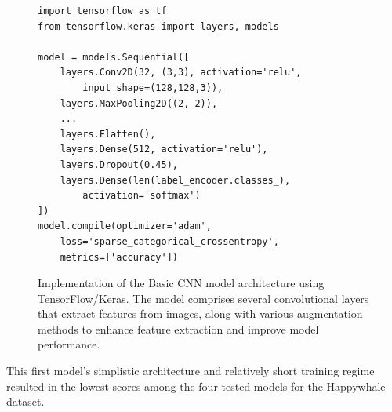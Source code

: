 \documentclass[twocolumn]{article}
\begin{document}
\lstset{
    language=Python,
    basicstyle=\footnotesize\ttfamily,
    breaklines=true,
    columns=fullflexible,
    frame=single
}

\begin{figure}[H]
\centering
\begin{minipage}{0.95\linewidth}
\begin{lstlisting}
import tensorflow as tf
from tensorflow.keras import layers, models

model = models.Sequential([
    layers.Conv2D(32, (3,3), activation='relu',
        input_shape=(128,128,3)),
    layers.MaxPooling2D((2, 2)),
    ...
    layers.Flatten(),
    layers.Dense(512, activation='relu'),
    layers.Dropout(0.45),
    layers.Dense(len(label_encoder.classes_),
        activation='softmax')
])
model.compile(optimizer='adam', 
    loss='sparse_categorical_crossentropy', 
    metrics=['accuracy'])
\end{lstlisting}
\end{minipage}
\caption{Implementation of the Basic CNN model architecture using TensorFlow/Keras. The model comprises several convolutional layers that extract features from images, along with various augmentation methods to enhance feature extraction and improve model performance.}
\label{fig:model1}
\end{figure}

This first model’s simplistic architecture and relatively short training regime resulted in the lowest scores among the four tested models for the Happywhale dataset.
\end{document}
